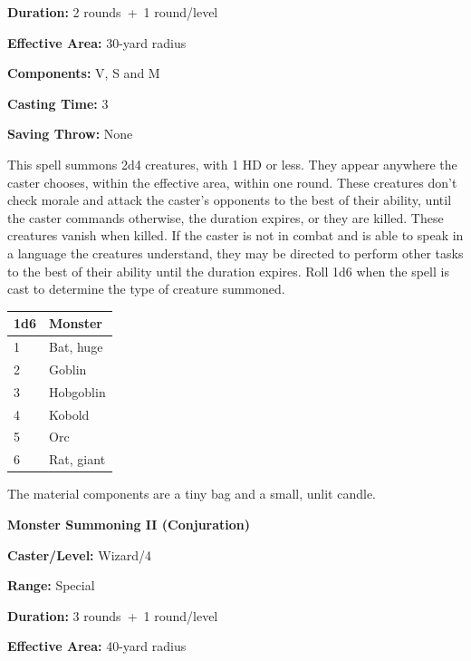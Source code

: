 \begin{multicols}{2}
\begin{minipage}{\columnwidth}
\noindent \textbf{Duration:} 2 rounds~+~1 round/level

\noindent \textbf{Effective Area:} 30-yard radius

\noindent \textbf{Components:} V, S and M

\noindent \textbf{Casting Time:} 3

\noindent \textbf{Saving Throw:} None

\end{minipage}

This spell summons 2d4 creatures, with 1 HD or less.  They appear anywhere the caster chooses, within the effective area, within one round.  These creatures don't check morale and attack the caster's opponents to the best of their ability, until the caster commands otherwise, the duration expires, or they are killed.  These creatures vanish when killed.  If the caster is not in combat and is able to speak in a language the creatures understand, they may be directed to perform other tasks to the best of their ability until the duration expires.  Roll 1d6 when the spell is cast to determine the type of creature summoned.

\noindent
\begin{tabular}{|p{}|p{}|}
\hline
1d6	& Monster \\
\hline\hline
\rowcolor[gray]{.9}1	& Bat, huge \\
2	& Goblin \\
\rowcolor[gray]{.9}3	& Hobgoblin \\
4	& Kobold \\
\rowcolor[gray]{.9}5	& Orc \\
6	& Rat, giant \\
\hline
\end{tabular}

The material components are a tiny bag and a small, unlit candle.

\vspace{1em}

\noindent
\begin{minipage}{\columnwidth}

\noindent \textbf{Monster Summoning II (Conjuration)}

\noindent \textbf{Caster/Level:} Wizard/4

\noindent \textbf{Range:} Special

\noindent \textbf{Duration:} 3 rounds~+~1 round/level

\noindent \textbf{Effective Area:} 40-yard radius


\end{minipage}
\end{multicols}
